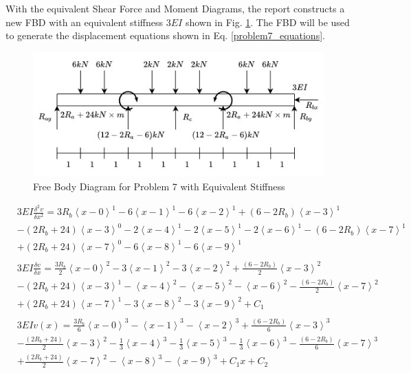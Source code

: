 \documentclass[a4paper]{article}
\begin{document}
With the equivalent Shear Force and Moment Diagrams, the report constructs a new FBD with an equivalent stiffness $3EI$ shown in Fig. \ref{FBD_7_new}. The FBD will be used to generate the displacement equations shown in Eq. \ref{problem7_equations}.

\begin{figure}[h]
\includegraphics[width=\textwidth]{FBD/FBD_7_new.jpg}
\caption{Free Body Diagram for Problem 7 with Equivalent Stiffness}
\label{FBD_7_new}
\end{figure}

\begin{equation}
    \begin{split}
& 3EI \frac{\delta^2 v}{\delta x^2} =3R_b\left<x-0\right>^1 - 6\left<x-1\right>^1 - 6\left<x-2\right>^1 + (6-2R_b)\left<x-3\right>^1  \\
& - (2R_b+24)\left<x-3\right>^0  - 2\left<x-4\right>^1 - 2\left<x-5\right>^1 - 2\left<x-6\right>^1 - (6-2R_b)\left<x-7\right>^1  \\
& + (2R_b+24)\left<x-7\right>^0   - 6\left<x-8\right>^1 - 6\left<x-9\right>^1\\
& \\
& 3EI \frac{\delta v}{\delta x} = \frac{3R_b}{2}\left<x-0\right>^2 - 3\left<x-1\right>^2 - 3\left<x-2\right>^2 + \frac{(6-2R_b)}{2}\left<x-3\right>^2   \\
& - (2R_b+24)\left<x-3\right>^1 - \left<x-4\right>^2 - \left<x-5\right>^2 - \left<x-6\right>^2 - \frac{(6-2R_b)}{2}\left<x-7\right>^2  \\
& + (2R_b+24)\left<x-7\right>^1 - 3\left<x-8\right>^2 - 3\left<x-9\right>^2 + C_1\\
& \\
& 3EI v(x) = \frac{3R_b}{6}\left<x-0\right>^3 - \left<x-1\right>^3 - \left<x-2\right>^3 + \frac{(6-2R_b)}{6}\left<x-3\right>^3  \\
& - \frac{(2R_b+24)}{2}\left<x-3\right>^2 - \frac{1}{3}\left<x-4\right>^3 - \frac{1}{3}\left<x-5\right>^3 - \frac{1}{3}\left<x-6\right>^3 - \frac{(6-2R_b)}{6}\left<x-7\right>^3  \\
& + \frac{(2R_b+24)}{2}\left<x-7\right>^2 - \left<x-8\right>^3 - \left<x-9\right>^3 + C_1x + C_2\\
    \end{split}
\label{problem7_equations}
\end{equation}
\end{document}
